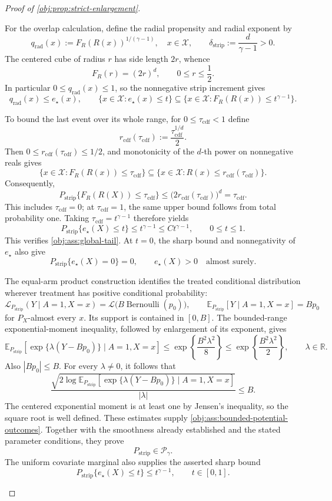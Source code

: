 \begin{proof}[Proof of \cref{obj:prop:strict-enlargement}]
\begin{enumerate}
For the overlap calculation, define the radial propensity and radial exponent by
\[
q_{\mathrm{rad}}(x)
:=F_R(R(x))^{1/(\gamma-1)},\quad x\in\mathcal X,
\qquad
\delta_{\mathrm{strip}}:=\frac d{\gamma-1}>0.
\]
The centered cube of radius \(r\) has side length \(2r\), whence
\[
F_R(r)=(2r)^d,\qquad 0\le r\le\frac12.
\]
In particular \(0\le q_{\mathrm{rad}}(x)\le1\), so the nonnegative strip increment gives
\[
q_{\mathrm{rad}}(x)\le e_\star(x),
\qquad
\{x\in\mathcal X:e_\star(x)\le t\}
\subseteq
\{x\in\mathcal X:F_R(R(x))\le t^{\gamma-1}\}.
\]

To bound the last event over its whole range, for \(0\le\tau_{\mathrm{cdf}}<1\) define
\[
r_{\mathrm{cdf}}(\tau_{\mathrm{cdf}})
:=\frac{\tau_{\mathrm{cdf}}^{1/d}}2.
\]
Then \(0\le r_{\mathrm{cdf}}(\tau_{\mathrm{cdf}})\le1/2\), and monotonicity of the \(d\)-th power on nonnegative reals gives
\[
\{x\in\mathcal X:F_R(R(x))\le\tau_{\mathrm{cdf}}\}
\subseteq
\{x\in\mathcal X:R(x)\le r_{\mathrm{cdf}}(\tau_{\mathrm{cdf}})\}.
\]
Consequently,
\[
P_{\mathrm{strip}}\{F_R(R(X))\le\tau_{\mathrm{cdf}}\}
\le
\bigl(2r_{\mathrm{cdf}}(\tau_{\mathrm{cdf}})\bigr)^d
=\tau_{\mathrm{cdf}}.
\]
This includes \(\tau_{\mathrm{cdf}}=0\); at \(\tau_{\mathrm{cdf}}=1\), the same upper bound follows from total probability one. Taking \(\tau_{\mathrm{cdf}}=t^{\gamma-1}\) therefore yields
\[
P_{\mathrm{strip}}\{e_\star(X)\le t\}
\le t^{\gamma-1}
\le Ct^{\gamma-1},
\qquad 0\le t\le1.
\]
This verifies \cref{obj:ass:global-tail}. At \(t=0\), the sharp bound and nonnegativity of \(e_\star\) also give
\[
P_{\mathrm{strip}}\{e_\star(X)=0\}=0,
\qquad
e_\star(X)>0\quad\text{almost surely}.
\]

The equal-arm product construction identifies the treated conditional distribution wherever treatment has positive conditional probability:
\[
\mathcal L_{P_{\mathrm{strip}}}(Y\mid A=1,X=x)
=\mathcal L\bigl(B\operatorname{Bernoulli}(p_0)\bigr),
\qquad
\mathbb E_{P_{\mathrm{strip}}}[Y\mid A=1,X=x]=Bp_0
\]
for \(P_X\)-almost every \(x\). Its support is contained in \([0,B]\). The bounded-range exponential-moment inequality, followed by enlargement of its exponent, gives
\[
\mathbb E_{P_{\mathrm{strip}}}
\!\left[\exp\{\lambda(Y-Bp_0)\}\mid A=1,X=x\right]
\le
\exp\left\{\frac{B^2\lambda^2}{8}\right\}
\le
\exp\left\{\frac{B^2\lambda^2}{2}\right\},
\qquad \lambda\in\mathbb R.
\]
Also \(|Bp_0|\le B\). For every \(\lambda\ne0\), it follows that
\[
\frac{
\sqrt{2\log\mathbb E_{P_{\mathrm{strip}}}
[\exp\{\lambda(Y-Bp_0)\}\mid A=1,X=x]}
}{|\lambda|}
\le B.
\]
The centered exponential moment is at least one by Jensen's inequality, so the square root is well defined. These estimates supply \cref{obj:ass:bounded-potential-outcomes}. Together with the smoothness already established and the stated parameter conditions, they prove
\[
P_{\mathrm{strip}}\in\mathcal P_\gamma.
\]
The uniform covariate marginal also supplies the asserted sharp bound
\[
P_{\mathrm{strip}}\{e_\star(X)\le t\}\le t^{\gamma-1},
\qquad t\in[0,1].
\]


\end{enumerate}
\end{proof}
